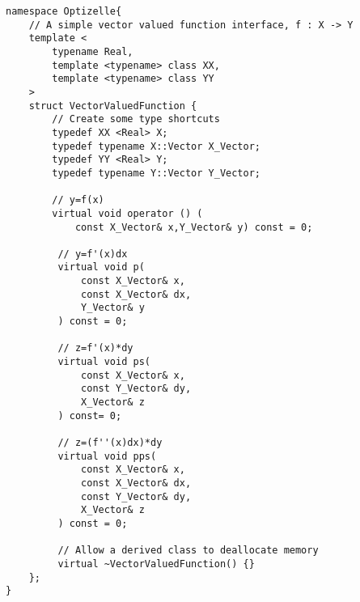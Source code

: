 \begin{lstlisting}[style=C++]
namespace Optizelle{
    // A simple vector valued function interface, f : X -> Y
    template <
        typename Real,
        template <typename> class XX,
        template <typename> class YY
    >
    struct VectorValuedFunction {
        // Create some type shortcuts
        typedef XX <Real> X;
        typedef typename X::Vector X_Vector;
        typedef YY <Real> Y;
        typedef typename Y::Vector Y_Vector;

        // y=f(x)
        virtual void operator () (
            const X_Vector& x,Y_Vector& y) const = 0;

         // y=f'(x)dx 
         virtual void p(
             const X_Vector& x,
             const X_Vector& dx,
             Y_Vector& y
         ) const = 0;

         // z=f'(x)*dy
         virtual void ps(
             const X_Vector& x,
             const Y_Vector& dy,
             X_Vector& z
         ) const= 0;

         // z=(f''(x)dx)*dy
         virtual void pps(
             const X_Vector& x,
             const X_Vector& dx,
             const Y_Vector& dy,
             X_Vector& z
         ) const = 0;

         // Allow a derived class to deallocate memory
         virtual ~VectorValuedFunction() {}
    };
}
\end{lstlisting}
